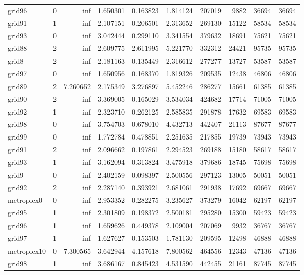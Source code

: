 \begin{longtable}{|l|r|r|r|r|r|r|r|r|r|}
grid96 & 0 & inf & 1.650301 & 0.163823 & 1.814124 & 207019 & 9882 & 36694 & 36694 \\
grid91 & 1 & inf & 2.107151 & 0.206501 & 2.313652 & 269130 & 15122 & 58534 & 58534 \\
grid93 & 0 & inf & 3.042444 & 0.299110 & 3.341554 & 379632 & 18691 & 75621 & 75621 \\
grid88 & 2 & inf & 2.609775 & 2.611995 & 5.221770 & 332312 & 24421 & 95735 & 95735 \\
grid8 & 2 & inf & 2.181163 & 0.135449 & 2.316612 & 277277 & 13727 & 53587 & 53587 \\
grid97 & 0 & inf & 1.650956 & 0.168370 & 1.819326 & 209535 & 12438 & 46806 & 46806 \\
grid89 & 2 & 7.260652 & 2.175349 & 3.276897 & 5.452246 & 286277 & 15661 & 61385 & 61385 \\
grid90 & 2 & inf & 3.369005 & 0.165029 & 3.534034 & 424682 & 17714 & 71005 & 71005 \\
grid92 & 1 & inf & 2.323710 & 0.262125 & 2.585835 & 291878 & 17632 & 69583 & 69583 \\
grid98 & 0 & inf & 3.754703 & 0.678010 & 4.432713 & 442407 & 21113 & 87677 & 87677 \\
grid99 & 0 & inf & 1.772784 & 0.478851 & 2.251635 & 217855 & 19739 & 73943 & 73943 \\
grid91 & 2 & inf & 2.096662 & 0.197861 & 2.294523 & 269188 & 15180 & 58617 & 58617 \\
grid93 & 1 & inf & 3.162094 & 0.313824 & 3.475918 & 379686 & 18745 & 75698 & 75698 \\
grid9 & 0 & inf & 2.402159 & 0.098397 & 2.500556 & 297123 & 13005 & 50051 & 50051 \\
grid92 & 2 & inf & 2.287140 & 0.393921 & 2.681061 & 291938 & 17692 & 69667 & 69667 \\
metroplex0 & 0 & inf & 2.953352 & 0.282275 & 3.235627 & 373279 & 16042 & 62197 & 62197 \\
grid95 & 1 & inf & 2.301809 & 0.198372 & 2.500181 & 295280 & 15300 & 59423 & 59423 \\
grid96 & 1 & inf & 1.659626 & 0.449378 & 2.109004 & 207069 & 9932 & 36767 & 36767 \\
grid97 & 1 & inf & 1.627627 & 0.153503 & 1.781130 & 209595 & 12498 & 46888 & 46888 \\
metroplex10 & 0 & 7.300565 & 3.642944 & 4.157618 & 7.800562 & 464556 & 12343 & 47136 & 47136 \\
grid98 & 1 & inf & 3.686167 & 0.845423 & 4.531590 & 442455 & 21161 & 87745 & 87745 \\

\end{longtable}
